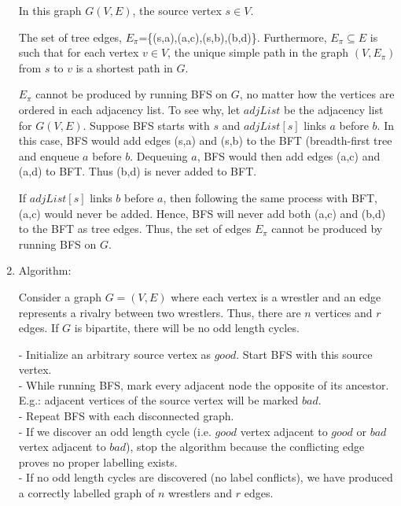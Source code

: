 \documentclass[a4paper]{report}
\begin{document}
\begin{enumerate}
      In this graph $G(V,E)$, the source vertex $s \in V$. 

      The set of tree edges, $E_{\pi}$=\{(s,a),(a,c),(s,b),(b,d)\}. Furthermore, $E_{\pi} \subseteq E$ 
      is such that for each vertex $v \in V$, the unique simple path in the graph $(V,E_{\pi})$ from $s$ to $v$
      is a shortest path in $G$.

      $E_{\pi}$ cannot be produced by running BFS on $G$, no matter how the vertices are ordered in each adjacency list.
      To see why, let $adjList$ be the adjacency list for $G(V,E)$. Suppose BFS starts with $s$ and $adjList[s]$ links $a$ before $b$.
      In this case, BFS would add edges (s,a) and (s,b) to the BFT (breadth-first tree and enqueue $a$ before $b$. Dequeuing $a$,
      BFS would then add edges (a,c) and (a,d) to BFT. Thus (b,d) is never added to BFT.

      If $adjList[s]$ links $b$ before $a$, then following the same process with BFT, (a,c) would never be added. Hence, BFS will never
      add both (a,c) and (b,d) to the BFT as tree edges. Thus, the set of edges $E_{\pi}$ cannot be produced by running BFS on $G$. 

    \pagebreak
    \bigskip
    \setcounter{equation}{0}
    \item 

      Algorithm:

      Consider a graph $G=(V,E)$ where each vertex is a wrestler and an edge represents a rivalry between two wrestlers.
      Thus, there are $n$ vertices and $r$ edges. If $G$ is bipartite, there will be no odd length cycles. 

      - Initialize an arbitrary source vertex as $good$. Start BFS with this source vertex. \\
      - While running BFS, mark every adjacent node the opposite of its ancestor. E.g.: adjacent vertices of the source vertex 
      will be marked $bad$. \\
      - Repeat BFS with each disconnected graph. \\
      - If we discover an odd length cycle (i.e. $good$ vertex adjacent to $good$ or $bad$ vertex adjacent to $bad$), stop 
      the algorithm because the conflicting edge proves no proper labelling exists. \\
      - If no odd length cycles are discovered (no label conflicts), we have produced a correctly labelled graph of $n$ wrestlers and $r$ edges. \\


\end{enumerate}
\end{document}
